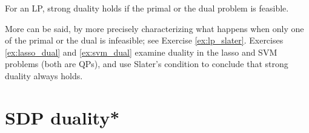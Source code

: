 \begin{Corollary}
\label{cor:slater_lp}
For an LP, strong duality holds if the primal or the dual problem is 
feasible. 
\end{Corollary}

More can be said, by more precisely characterizing what happens when only one of
the primal or the dual is infeasible; see Exercise \ref{ex:lp_slater}. Exercises
\ref{ex:lasso_dual} and \ref{ex:svm_dual} examine duality in the lasso and SVM
problems (both are QPs), and use Slater's condition to conclude that strong
duality always holds.       

\section{SDP duality*}
\label{sec:sdp_duality}

